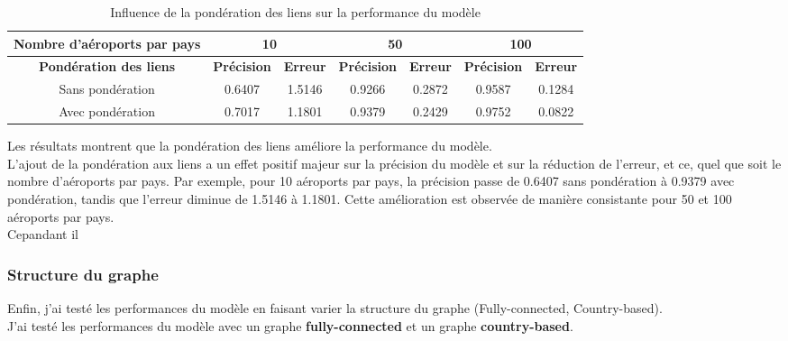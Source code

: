 \begin{table}[h!]
    \centering

    \begin{tabular}{|c||c|c|c|c|c|c|}
        \hline
        \textbf{Nombre d'aéroports par pays} & \multicolumn{2}{c|}{10} & \multicolumn{2}{c|}{50} & \multicolumn{2}{c|}{100}                                                          \\ \hline \hline
        \textbf{Pondération des liens}       & \textbf{Précision}      & \textbf{Erreur}         & \textbf{Précision}       & \textbf{Erreur} & \textbf{Précision} & \textbf{Erreur} \\ \hline
        Sans pondération                     & 0.6407                  & 1.5146                  & 0.9266                   & 0.2872          & 0.9587             & 0.1284          \\ \hline
        Avec pondération                     & 0.7017                  & 1.1801                  & 0.9379                   & 0.2429          & 0.9752             & 0.0822          \\ \hline

    \end{tabular}
    \caption{Influence de la pondération des liens sur la performance du modèle}
\end{table}

Les résultats montrent que la pondération des liens améliore la performance du
modèle.\\

L'ajout de la pondération aux liens a un effet positif majeur sur la précision
du modèle et sur la réduction de l'erreur, et ce, quel que soit le nombre
d'aéroports par pays. Par exemple, pour 10 aéroports par pays, la précision
passe de 0.6407 sans pondération à 0.9379 avec pondération, tandis que l'erreur
diminue de 1.5146 à 1.1801. Cette amélioration est observée de manière
consistante pour 50 et 100 aéroports par pays.\\

Cepandant il

\subsubsection{Structure du graphe}

Enfin, j'ai testé les performances du modèle en faisant varier la structure du
graphe (Fully-connected, Country-based).\\ J'ai testé les performances du
modèle avec un graphe \textbf{fully-connected} et un graphe
\textbf{country-based}.\\

